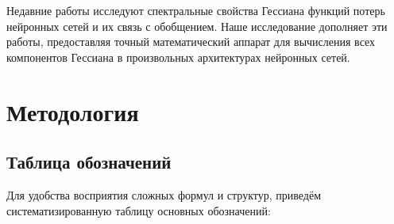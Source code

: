 \documentclass[11pt]{article}
\begin{document}
Недавние работы \citep{ghorbani2019investigation, sagun2017empirical} исследуют спектральные свойства
Гессиана функций потерь нейронных сетей и их связь с обобщением. Наше исследование дополняет эти работы,
предоставляя точный математический аппарат для вычисления всех компонентов Гессиана в произвольных
архитектурах нейронных сетей.

\section{Методология}

\subsection{Таблица обозначений}

Для удобства восприятия сложных формул и структур, приведём систематизированную таблицу основных обозначений:
\end{document}
